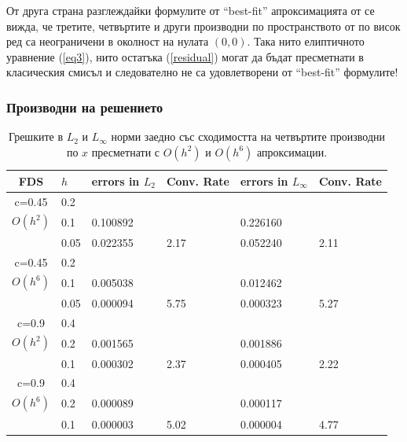 \documentclass[a4paper]{article}
\newcommand{\rf}[1]{(\ref{#1})}
\theoremstyle{remark}
\begin{document}
От друга страна разглеждайки формулите от ``best-fit'' апроксимацията от \cite{Ch2011} се вижда, че третите, четвъртите и други производни по пространството от по висок ред са неограничени в околност на нулата $(0,0)$. Така нито елиптичното уравнение \rf{eq3}, нито остатъка \rf{residual} могат да бъдат пресметнати в класическия смисъл и следователно не са удовлетворени от ``best-fit'' формулите!

\subsubsection{Производни на решението}
\begin{center}
\begin{table}[ht]
\centering
		\begin{tabular}{||c|l|ll|ll||}
			\hline
			\hline
      FDS       & $h$ &errors in $L_2$&Conv. Rate& errors in $L_\infty$&Conv. Rate\\
   			\hline 
					\hline 
      c=0.45    	& 0.2  	&             		&             &                    &   \\
   $O(h^2)$     	& 0.1    	& 0.100892  	&             	& 0.226160 &   \\
                		& 0.05   & 0.022355  	& 2.17  		& 0.052240 &2.11 \\
               	 \hline 
      c=0.45    	& 0.2  	&             		&             &                    &   \\
   $O(h^6)$     	& 0.1    	& 0.005038  	&             &  0.012462 &   \\
                		& 0.05   & 0.000094  	& 5.75 	  &  0.000323 &5.27 \\
			\hline
			\hline 	
      c=0.9     	& 0.4  	&             		&             &                    &   \\
   $O(h^2)$     	& 0.2    	& 0.001565  	&             	&0.001886 &   \\
                		& 0.1    & 0.000302  	& 2.37  		&0.000405 &2.22 \\
               	 \hline 
      c=0.9     	& 0.4  	&             		&             &                    &   \\
   $O(h^6)$     	& 0.2    	& 0.000089  	&             & 0.000117 &   \\
                		& 0.1    & 0.000003  	& 5.02 	  & 0.000004  &4.77 \\
		   \hline
			\hline 
		\end{tabular}
		\caption{Грешките в $L_2$ и $L_\infty$ норми заедно със сходимостта на четвъртите производни по $x$ пресметнати с $O(h^2)$ и $O(h^6)$ апроксимации.}
\label{tab:fourth-der}
\end{table}
\end{center}
\end{document}

